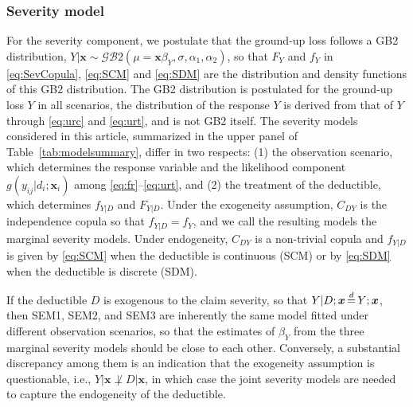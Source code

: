 \documentclass[11pt]{article}
\begin{document}
\subsubsection{Severity model}

For the severity component, we postulate {that the ground-up loss follows a} GB2 distribution{, $Y|\bm{x} \sim \mathcal{GB}2(\mu=\bm{x}\beta_{Y}, \sigma, \alpha_1, \alpha_2)$, so that $F_{Y}$ and $f_{Y}$ in \eqref{eq:SevCopula}, \eqref{eq:SCM} and \eqref{eq:SDM} are the distribution and density functions of this GB2 distribution. The GB2 distribution is postulated for the ground-up loss $Y$ in all scenarios, the distribution of the response $Y$ is derived from that of $Y$ through \eqref{eq:urc} and \eqref{eq:urt}, and is not GB2 itself. The severity models considered in this article, summarized in the upper panel of Table~\ref{tab:modelsummary}, differ in two respects: (1) the observation scenario, which determines the response variable and the likelihood component $g(y_{ij}|d_i;\bm{x}_i)$ among \eqref{eq:fr}--\eqref{eq:urt}, and (2) the treatment of the deductible, which determines $f_{Y|D}$ and $F_{Y|D}$. Under the exogeneity assumption, $C_{DY}$ is the independence copula so that $f_{Y|D}=f_{Y}$, and we call the resulting models the marginal severity models. Under endogeneity, $C_{DY}$ is a non-trivial copula and $f_{Y|D}$ is given by \eqref{eq:SCM} when the deductible is continuous (SCM) or by \eqref{eq:SDM} when the deductible is discrete (SDM).}

{If the deductible $D$ is exogenous to the claim severity, so that $Y|D; \bm{x}  \,{\buildrel d \over =}\,   Y;\bm{x}$, then SEM1, SEM2, and SEM3 are inherently the same model fitted under different observation scenarios, so that the estimates of $\beta_{Y}$ from the three marginal severity models should be close to each other. Conversely, a substantial discrepancy among them is an indication that the exogeneity assumption is questionable, i.e., $Y|\bm{x} \not\perp D|\bm{x}$, in which case the joint severity models are needed to capture the endogeneity of the deductible.}
\end{document}

